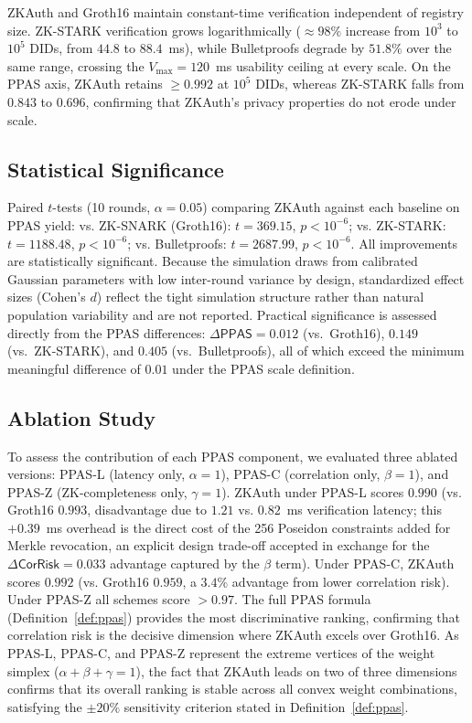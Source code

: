 \documentclass[journal,12pt,onecolumn]{IEEEtran}
\begin{document}
ZKAuth and Groth16 maintain constant-time verification independent of
registry size. ZK-STARK verification grows logarithmically
($\approx 98\%$ increase from $10^3$ to $10^5$ DIDs, from $44.8$ to
$88.4$~ms), while Bulletproofs degrade by $51.8\%$ over the same range,
crossing the $V_{\max} = 120$~ms usability ceiling at every scale. On
the PPAS axis, ZKAuth retains $\geq 0.992$ at $10^5$ DIDs, whereas
ZK-STARK falls from $0.843$ to $0.696$, confirming that ZKAuth's
privacy properties do not erode under scale.

\subsection{Statistical Significance}

Paired $t$-tests (10 rounds, $\alpha = 0.05$) comparing ZKAuth against
each baseline on PPAS yield: vs. ZK-SNARK (Groth16): $t = 369.15$,
$p < 10^{-6}$; vs. ZK-STARK: $t = 1188.48$, $p < 10^{-6}$; vs.
Bulletproofs: $t = 2687.99$, $p < 10^{-6}$. All improvements are statistically significant. Because the simulation
draws from calibrated Gaussian parameters with low inter-round variance
by design, standardized effect sizes (Cohen's $d$) reflect the
tight simulation structure rather than natural population variability
and are not reported. Practical significance is assessed directly
from the PPAS differences: $\Delta\mathsf{PPAS} = 0.012$ (vs.\
Groth16), $0.149$ (vs.\ ZK-STARK), and $0.405$ (vs.\ Bulletproofs),
all of which exceed the minimum meaningful difference of $0.01$ under
the PPAS scale definition.

\subsection{Ablation Study}

To assess the contribution of each PPAS component, we evaluated three
ablated versions: PPAS-L (latency only, $\alpha=1$), PPAS-C (correlation
only, $\beta=1$), and PPAS-Z (ZK-completeness only, $\gamma=1$). ZKAuth
under PPAS-L scores $0.990$ (vs. Groth16 $0.993$, disadvantage due to
$1.21$ vs. $0.82$~ms verification latency; this $+0.39$~ms overhead is
the direct cost of the 256 Poseidon constraints added for Merkle
revocation, an explicit design trade-off accepted in exchange for the
$\Delta\mathsf{CorRisk} = 0.033$ advantage captured by the $\beta$ term).
Under PPAS-C, ZKAuth scores
$0.992$ (vs. Groth16 $0.959$, a $3.4\%$ advantage from lower correlation
risk). Under PPAS-Z all schemes score $>0.97$. The full PPAS formula
(Definition~\ref{def:ppas}) provides the most discriminative ranking,
confirming that correlation risk is the decisive dimension where ZKAuth
excels over Groth16. As PPAS-L, PPAS-C, and PPAS-Z represent the
extreme vertices of the weight simplex ($\alpha{+}\beta{+}\gamma=1$),
the fact that ZKAuth leads on two of three dimensions confirms that its
overall ranking is stable across all convex weight combinations,
satisfying the $\pm 20\%$ sensitivity criterion stated in
Definition~\ref{def:ppas}.
\end{document}
